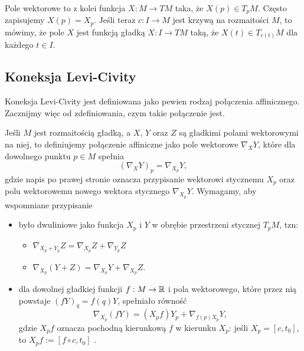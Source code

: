 Pole wektorowe to z kolei funkcja $X:M\to TM$ taka, że $X(p)\in T_pM$. Często zapisujemy $X(p)=X_p$. Jeśli teraz $c:I\to M$ jest krzywą na rozmaitości $M$, to mówimy, że pole $X$ jest funkcją gładką $X:I\to TM$ taką, że $X(t)\in T_{c(t)}M$ dla każdego $t\in I$.

\subsection{Koneksja Levi-Civity}
\label{dodatek koneksja}

Koneksja Levi-Civity jest definiowana jako pewien rodzaj połączenia affinicznego. Zacznijmy więc od zdefiniowania, czym takie połączenie jest. 

Jeśli $M$ jest rozmaitością gładką, a $X$, $Y$ oraz $Z$ są gładkimi polami wektorowymi na niej, to definiujemy połączenie affiniczne jako pole wektorowe $\nabla_XY$, które dla dowolnego punktu $p\in M$ spełnia
$$(\nabla_XY)_p=\nabla_{X_p}Y,$$
gdzie napis po prawej stronie oznacza przypisanie wektorowi stycznemu $X_p$ oraz polu wektorowemu nowego wektora stycznego $\nabla_{X_p}Y$. Wymagamy, aby wspomniane przypisanie
\begin{itemize}
  \item było dwuliniowe jako funkcja $X_p$ i $Y$ w obrębie przestrzeni stycznej $T_pM$, tzn:
    \begin{itemize}
      \item $\nabla_{X_p+Y_p}Z=\nabla_{X_p}Z+\nabla_{Y_p}Z$
      \item $\nabla_{X_p}(Y+Z)=\nabla_{X_p}Y+\nabla_{X_p}Z$.
    \end{itemize}
  \item dla dowolnej gładkiej funkcji $f:M\to\mathbb{R}$ i pola wektorowego, które przez nią powstaje $(fY)_q=f(q)Y$, spełniało równość
    $$\nabla_{X_p}(fY)=(X_pf)Y_p+\nabla_{f(p)X_p}Y,$$
    gdzie $X_pf$ oznacza pochodną kierunkową $f$ w kierunku $X_p$: jeśli $X_p=[c, t_0]$, to $X_pf:=[f\circ c, t_0]$ \cite{morseTheory}.
\end{itemize}


